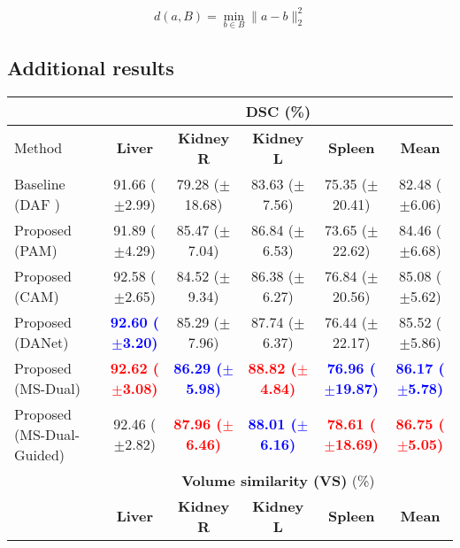 \documentclass[journal]{IEEEtran}
\begin{document}
\begin{equation}
    d(a,B) = \min_{b \in B} \| a - b\|^2_2
\end{equation}




\subsection*{\textbf{Additional results}}

\begin{table*}[ht!]
\centering
\scriptsize
\begin{tabular}{lcccc|c}\\
\toprule
 & \multicolumn{5}{c}{\textbf{DSC} (\%)}\\
 \midrule
Method & \textbf{Liver} & \textbf{Kidney R} & \textbf{Kidney L} & \textbf{Spleen} & \textbf{Mean}  \\
\midrule
Baseline (DAF \cite{wang18d})  &  91.66 ($\pm$2.99) & 79.28 ($\pm$18.68)& 83.63 ($\pm$7.56) &  75.35 ($\pm$20.41)&  82.48 ($\pm$6.06)   \\
Proposed (PAM)     &  91.89 ($\pm$4.29)& 85.47 ($\pm$7.04)& 86.84 ($\pm$6.53)  & 73.65 ($\pm$22.62)& 84.46 ($\pm$6.68)   \\
Proposed (CAM)     &  92.58 ($\pm$2.65) & 84.52 ($\pm$9.34)& 86.38 ($\pm$6.27)& 76.84 ($\pm$20.56) & 85.08 ($\pm$5.62)\\
Proposed (DANet) &  \textcolor{blue}{\textbf{92.60 ($\pm$3.20)}} & 85.29 ($\pm$7.96) & 87.74 ($\pm$6.37)& 76.44 ($\pm$22.17)&  85.52 ($\pm$5.86)       \\
Proposed (MS-Dual)  & \textcolor{red}{\textbf{92.62 ($\pm$3.08)}}  & \textcolor{blue}{\textbf{86.29 ($\pm$5.98)}} & \textcolor{red}{\textbf{88.82 ($\pm$4.84)}}  & \textcolor{blue}{\textbf{76.96 ($\pm$19.87)}} &  \textcolor{blue}{\textbf{86.17 ($\pm$5.78)}}\\
Proposed (MS-Dual-Guided)  & 92.46 ($\pm$2.82)  & \textcolor{red}{\textbf{87.96 ($\pm$6.46)}}& \textcolor{blue}{\textbf{88.01 ($\pm$6.16)}}  & \textcolor{red}{\textbf{78.61 ($\pm$18.69)}} &  \textcolor{red}{\textbf{86.75 ($\pm$5.05)}}\\
\midrule
& \multicolumn{5}{c}{\textbf{Volume similarity (VS)} (\%)}\\
 \midrule
 & \textbf{Liver} & \textbf{Kidney R} & \textbf{Kidney L} & \textbf{Spleen} & \textbf{Mean}  \\


\end{tabular}
\end{table*}
\end{document}

